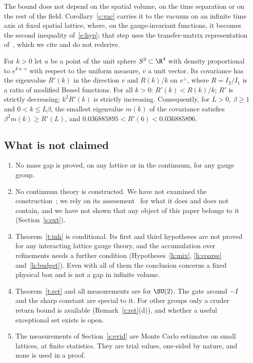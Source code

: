 The bound does not depend on the spatial volume, on the time separation or on the rest of the field.
Corollary~\ref{c:vac} carries it to the vacuum on an infinite time axis at fixed spatial lattice, where, on the gauge-invariant functions, it
becomes the second inequality of~\eqref{e:hyp}; that step uses the transfer-matrix representation
of~\cite{Lu77,OS78}, which we cite and do not rederive.

\begin{proposition}\label{p:haar}
For $k>0$ let $u$ be a point of the unit sphere $S^3\subset\R^4$ with density proportional to
$e^{k\,u\cdot v}$ with respect to the uniform measure, $v$ a unit vector. Its covariance has the eigenvalue
$R'(k)$ in the direction $v$ and $R(k)/k$ on $v^\perp$, where $R=I_2/I_1$ is a ratio of modified Bessel
functions. For all $k>0$: $R'(k)<R(k)/k$; $R'$ is strictly decreasing; $k^2R'(k)$ is strictly increasing.
Consequently, for $L>0$, $\beta\ge1$ and $0<k\le L\beta$, the smallest eigenvalue $m(k)$ of the covariance
satisfies $\beta^2m(k)\ge R'(L)$, and $0.036885895<R'(6)<0.036885896$.
\end{proposition}

\subsection{What is not claimed}\label{s:not}
\begin{enumerate}
\item No mass gap is proved, on any lattice or in the continuum, for any gauge group.
\item No continuum theory is constructed. We have not examined the construction~\cite{OAI}; we rely on its
assessment~\cite{YMG} for what it does and does not contain, and we have not shown that any object of this
paper belongs to it (Section~\ref{s:ext}).
\item Theorem~\ref{t:inh} is conditional. Its first and third hypotheses are not proved for any interacting
lattice gauge theory, and the accumulation over refinements needs a further condition
(Hypotheses~\ref{h:mix}, \ref{h:coarse} and~\ref{h:budget}). Even with all of them the conclusion concerns a
fixed physical box and is not a gap in infinite volume.
\item Theorem~\ref{t:ret} and all measurements are for $\SU(2)$. The gate around $-I$ and the sharp constant
are special to it. For other groups only a cruder return bound is available (Remark~\ref{r:ret}(d)), and
whether a useful exceptional set exists is open.
\item The measurements of Section~\ref{s:evid} are Monte Carlo estimates on small lattices, at finite
statistics. They are trial values, one-sided by nature, and none is used in a proof.
\end{enumerate}

